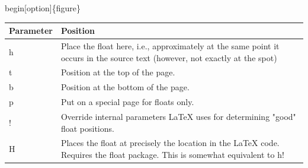 \documentclass[10pt,times]{beamer}
\begin{document}
\begin{frame}[fragile]{\bs begin[option]\{figure\}}
\renewcommand{\arraystretch}{1.5}
\begin{tabularx}{\textwidth}{l X}
\toprule
\textbf{Parameter} &	\textbf{Position} \\ \midrule
h &	Place the float here, i.e., approximately at the same point it occurs in 
the source text (however, not exactly at the spot) \\
t &	Position at the top of the page. \\
b &	Position at the bottom of the page. \\
p &	Put on a special page for floats only. \\
! &	Override internal parameters LaTeX uses for determining "good" float 
positions. \\
H &	Places the float at precisely the location in the LaTeX code. Requires the 
float package. This is somewhat equivalent to h! \\ \bottomrule
\end{tabularx}
\end{frame}
\end{document}
